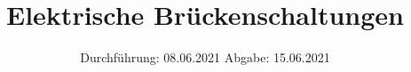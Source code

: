 

\subject{V301}
\title{Elektrische Brückenschaltungen}
\date{%
  Durchführung: 08.06.2021
  \hspace{3em}
  Abgabe: 15.06.2021
}



\maketitle
\thispagestyle{empty}
\tableofcontents
\newpage







\printbibliography{}


